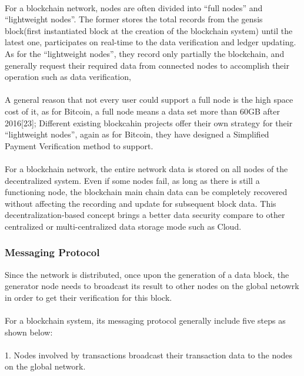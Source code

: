 \documentclass[doublespacing]{bmcart}
\begin{document}
\begin{CJK*}{UTF8}{gbsn}
\paragraph{} For a blockchain network, nodes are often divided into ``full nodes'' and ``lightweight nodes''. The former stores the total records from the gensis block(first instantiated block at the creation of the blockchain system) until the latest one, participates on real-time to the data verification and ledger updating. As for the ``lightweight nodes'', they record only partially the blockchain, and generally request their required data from connected nodes to accomplish their operation such as data verification, \paragraph{} A general reason that not every user could support a full node is the high space cost of it, as for Bitcoin, a full node means a data set more than 60GB after 2016[23];
Different existing blockcahin projects offer their own strategy for their ``lightweight nodes'', again as for Bitcoin, they have designed a Simplified Payment Verification method to support.
\paragraph{} For a blockchain network, the entire network data is stored on all nodes of the decentralized system. Even if some nodes fail, as long as there is still a functioning node, the blockchain main chain data can be completely recovered without affecting the recording and update for subsequent block data. This decentralization-based concept brings a better data security compare to other centralized or multi-centralized data storage mode such as Cloud.
\subsubsection*{Messaging Protocol}
Since the network is distributed, once upon the generation of a data block, the generator node needs to broadcast its result to other nodes on the global netowrk in order to get their verification for this block.
\paragraph{} For a blockchain system, its messaging protocol generally include five steps as shown below:
\paragraph{} 1. Nodes involved by transactions broadcast their transaction data to the nodes on the global network.

\end{CJK*}
\end{document}
